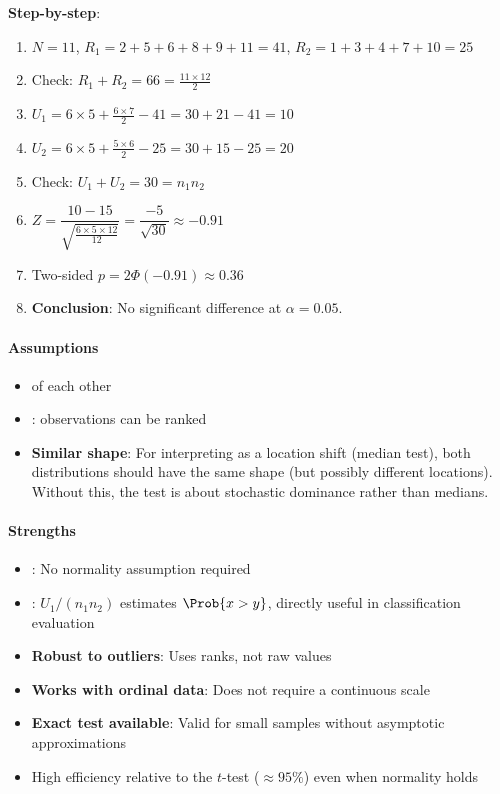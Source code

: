 \textbf{Step-by-step}:
\begin{enumerate}
    \item $N = 11$, $R_1 = 2+5+6+8+9+11 = 41$, $R_2 = 1+3+4+7+10 = 25$
    \item Check: $R_1 + R_2 = 66 = \frac{11 \times 12}{2}$ \checkmark
    \item $U_1 = 6 \times 5 + \frac{6 \times 7}{2} - 41 = 30 + 21 - 41 = 10$
    \item $U_2 = 6 \times 5 + \frac{5 \times 6}{2} - 25 = 30 + 15 - 25 = 20$
    \item Check: $U_1 + U_2 = 30 = n_1 n_2$ \checkmark
    \item $Z = \dfrac{10 - 15}{\sqrt{\frac{6 \times 5 \times 12}{12}}} = \dfrac{-5}{\sqrt{30}} \approx -0.91$
    \item Two-sided $p = 2\Phi(-0.91) \approx 0.36$
    \item \textbf{Conclusion}: No significant difference at $\alpha = 0.05$.
\end{enumerate}

\paragraph{Assumptions}
\begin{itemize}
    \item {} of each other
    \item {}: observations can be ranked
    \item \textbf{Similar shape}: For interpreting as a location shift (median test), both
        distributions should have the same shape (but possibly different locations). Without
        this, the test is about stochastic dominance rather than medians.
\end{itemize}

\paragraph{Strengths}
\begin{itemize}
    \item {}: No normality assumption required
    \item {}: $U_1 / (n_1 n_2)$ estimates $\Prob{x > y}$, directly useful
        in classification evaluation
    \item \textbf{Robust to outliers}: Uses ranks, not raw values
    \item \textbf{Works with ordinal data}: Does not require a continuous scale
    \item \textbf{Exact test available}: Valid for small samples without asymptotic approximations
    \item High efficiency relative to the $t$-test ($\approx 95\%$) even when normality holds
\end{itemize}

